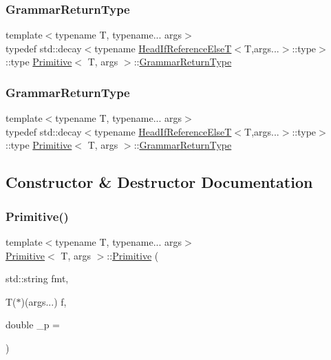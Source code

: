 \subsubsection{\texorpdfstring{Grammar\+Return\+Type}{GrammarReturnType}\hspace{0.1cm}{\footnotesize\ttfamily [1/2]}}
{\footnotesize\ttfamily template$<$typename T, typename... args$>$ \\
typedef std\+::decay$<$typename \hyperlink{struct_head_if_reference_else_t}{Head\+If\+Reference\+ElseT}$<$T,args...$>$\+::type$>$\+::type \hyperlink{struct_primitive}{Primitive}$<$ T, args $>$\+::\hyperlink{struct_primitive_a1f2d2db3fb7869d03d65112e30d22101}{Grammar\+Return\+Type}}

\mbox{\label{struct_primitive_a1f2d2db3fb7869d03d65112e30d22101}} 
\subsubsection{\texorpdfstring{Grammar\+Return\+Type}{GrammarReturnType}\hspace{0.1cm}{\footnotesize\ttfamily [2/2]}}
{\footnotesize\ttfamily template$<$typename T, typename... args$>$ \\
typedef std\+::decay$<$typename \hyperlink{struct_head_if_reference_else_t}{Head\+If\+Reference\+ElseT}$<$T,args...$>$\+::type$>$\+::type \hyperlink{struct_primitive}{Primitive}$<$ T, args $>$\+::\hyperlink{struct_primitive_a1f2d2db3fb7869d03d65112e30d22101}{Grammar\+Return\+Type}}



\subsection{Constructor \& Destructor Documentation}
\mbox{\label{struct_primitive_a4303c3567a7bb2921d298f48b07b0add}} 
\subsubsection{\texorpdfstring{Primitive()}{Primitive()}\hspace{0.1cm}{\footnotesize\ttfamily [1/2]}}
{\footnotesize\ttfamily template$<$typename T, typename... args$>$ \\
\hyperlink{struct_primitive}{Primitive}$<$ T, args $>$\+::\hyperlink{struct_primitive}{Primitive} (\begin{DoxyParamCaption}\item[{std\+::string}]{fmt,  }\item[{T($\ast$)(args...)}]{f,  }\item[{double}]{\+\_\+p = {} }\end{DoxyParamCaption})\hspace{0.3cm}{\ttfamily [inline]}}

